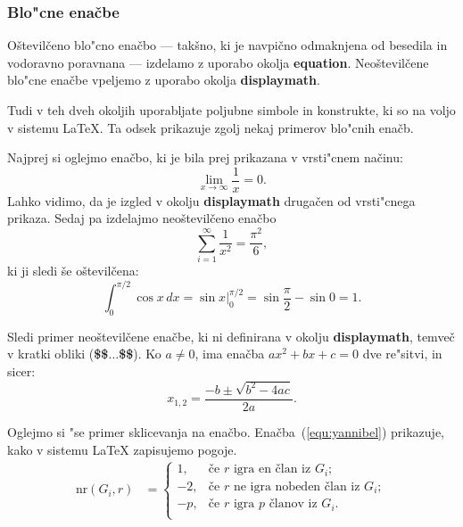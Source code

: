 \documentclass[sigconf,nonacm]{acmart}
\begin{document}
\subsubsection{Blo"cne enačbe}

Oštevilčeno blo"cno enačbo --- takšno, ki je navpično odmaknjena od besedila
in vodoravno poravnana --- izdelamo z uporabo okolja \textbf{equation}.
Neoštevilčene blo"cne enačbe vpeljemo z uporabo okolja \textbf{displaymath}.

Tudi v teh dveh okoljih uporabljate poljubne simbole in konstrukte, ki so na
voljo v sistemu \LaTeX. Ta odsek prikazuje zgolj nekaj primerov blo"cnih
enačb.

Najprej si oglejmo enačbo, ki je bila prej prikazana v vrsti"cnem načinu: 
%
\begin{equation}
\lim_{x\rightarrow \infty}\frac{1}{x}=0.
\end{equation}
%
Lahko vidimo, da je izgled v okolju \textbf{displaymath} drugačen od vrsti"cnega
prikaza.  Sedaj pa izdelajmo neoštevilčeno enačbo
%
\begin{displaymath}
    \sum_{i=1}^{\infty} \frac{1}{x^2} = \frac{\pi^2}{6},
\end{displaymath}
%
ki ji sledi še oštevilčena:
%
\begin{equation}
    \int_{0}^{\pi/2} \cos x\,dx = \sin x\bigg\rvert_{0}^{\pi/2} = \sin
    \frac{\pi}{2} - \sin 0 = 1.
\end{equation}

Sledi primer neoštevilčene enačbe, ki ni definirana v okolju
\textbf{displaymath}, temveč v kratki obliki (\textbf{\$\$$\ldots$\$\$}).  Ko $a
\ne 0$, ima enačba $ax^2 + bx + c = 0$ dve re"sitvi, in sicer:
%
$$x_{1, 2} = \frac{-b \pm \sqrt{b^2-4ac}}{2a}.$$

Oglejmo si "se primer sklicevanja na enačbo. Enačba~(\ref{equ:yannibel})
prikazuje, kako v sistemu \LaTeX{} zapisujemo pogoje.
%
\begin{equation}
    \begin{aligned} 
        \mathrm{nr}(G_i,r) & = \label{equ:yannibel}
        \begin{cases}
            1,  & \text{če $r$ igra en član iz $G_i$};\\
            -2, & \text{če $r$ ne igra nobeden član iz $G_i$}; \\
            -p, & \text{če $r$ igra $p$ članov iz $G_i$}.\\
        \end{cases}
    \end{aligned}
\end{equation}
\end{document}
